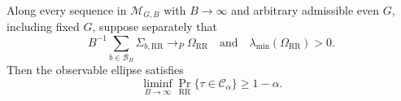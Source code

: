 Along every sequence in \(\mathcal M_{G,B}\) with \(B\to\infty\) and arbitrary admissible even \(G\), including fixed \(G\), suppose separately that
\[
B^{-1}\sum_{b\in\mathcal B_B}\Sigma_{b,\mathrm{RR}}\to_P\Omega_{\mathrm{RR}}
\quad\text{and}\quad
\lambda_{\min}(\Omega_{\mathrm{RR}})>0.
\]
Then the observable ellipse satisfies
\[
\liminf_{B\to\infty}\Pr_{\mathrm{RR}}\{\tau\in\mathcal C_\alpha\}\geq1-\alpha.
\]